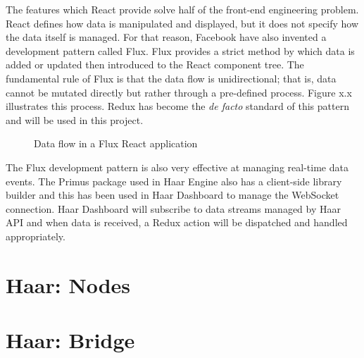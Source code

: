     The features which React provide solve half of the front-end engineering problem. React defines how data is manipulated and displayed, but it does not specify how the data itself is managed. For that reason, Facebook have also invented a development pattern called Flux. Flux provides a strict method by which data is added or updated then introduced to the React component tree. The fundamental rule of Flux is that the data flow is unidirectional; that is, data cannot be mutated directly but rather through a pre-defined process. Figure x.x illustrates this process. Redux has become the \textit{de facto} standard of this pattern and will be used in this project.

    \begin{figure}
    \centering
    \caption{Data flow in a Flux React application}\label{figure:flux-flow}
  \end{figure}

  The Flux development pattern is also very effective at managing real-time data events. The Primus package used in Haar Engine also has a client-side library builder and this has been used in Haar Dashboard to manage the WebSocket connection. Haar Dashboard will subscribe to data streams managed by Haar API and when data is received, a Redux action will be dispatched and handled appropriately.

  \section{Haar: Nodes}
  \section{Haar: Bridge}
